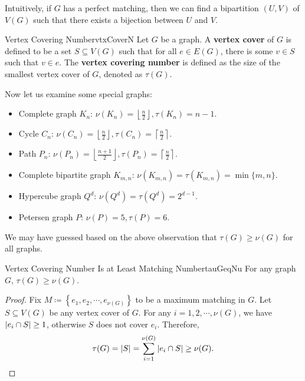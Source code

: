 \documentclass[math]{amznotes}
\theoremstyle{remark}
\begin{document}
Intuitively, if $G$ has a perfect matching, then we can find a bipartition $(U, V)$ of $V(G)$ such that there exists a bijection between $U$ and $V$.
\begin{dfnbox}{Vertex Covering Number}{vtxCoverN}
    Let $G$ be a graph. A {\color{red} \textbf{vertex cover}} of $G$ is defined to be a set $S \subseteq V(G)$ such that for all $e \in E(G)$, there is some $v \in S$ such that $v \in e$. The {\color{red} \textbf{vertex covering number}} is defined as the size of the smallest vertex cover of $G$, denoted as $\tau(G)$.
\end{dfnbox}
Now let us examine some special graphs:
\begin{itemize}
    \item Complete graph $K_n$: $\nu(K_n) = \left\lfloor\frac{n}{2}\right\rfloor, \tau(K_n) = n - 1$.
    \item Cycle $C_n$: $\nu(C_n) = \left\lfloor\frac{n}{2}\right\rfloor, \tau(C_n) = \left\lceil\frac{n}{2}\right\rceil$.
    \item Path $P_n$: $\nu(P_n) = \left\lfloor\frac{n + 1}{2}\right\rfloor, \tau(P_n) = \left\lceil\frac{n}{2}\right\rceil$.
    \item Complete bipartite graph $K_{m, n}$: $\nu(K_{m, n}) = \tau(K_{m, n}) = \min\{m, n\}$.
    \item Hypercube graph $Q^d$: $\nu(Q^d) = \tau(Q^d) = 2^{d - 1}$.
    \item Petersen graph $P$: $\nu(P) = 5, \tau(P) = 6$.
\end{itemize}
We may have guessed based on the above observation that $\tau(G) \geq \nu(G)$ for all graphs.
\begin{probox}{Vertex Covering Number Is at Least Matching Number}{tauGeqNu}
    For any graph $G$, $\tau(G) \geq \nu(G)$.
    \tcblower
    \begin{proof}
        Fix $M \coloneqq \left\{e_1, e_2, \cdots, e_{\nu(G)}\right\}$ to be a maximum matching in $G$. Let $S \subseteq V(G)$ be any vertex cover of $G$. For any $i = 1, 2, \cdots, \nu(G)$, we have ${\left\lvert {e_i \cap S} \right\rvert} \geq 1$, otherwise $S$ does not cover $e_i$. Therefore,
        \begin{equation*}
            \tau(G) = {\left\lvert {S} \right\rvert} = \sum_{i = 1}^{\nu(G)}{\left\lvert {e_i \cap S} \right\rvert} \geq \nu(G).
        \end{equation*}
    \end{proof}
\end{probox}
\end{document}
